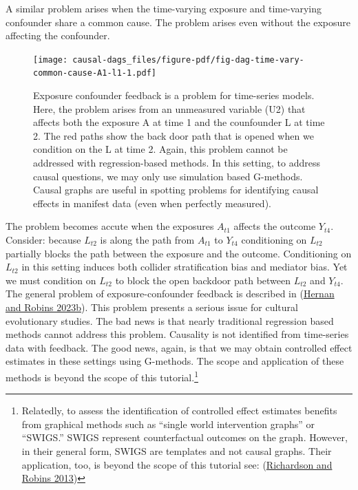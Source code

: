 \documentclass[
  singlecolumn]{report}
\begin{document}
A similar problem arises when the time-varying exposure and time-varying
confounder share a common cause. The problem arises even without the
exposure affecting the confounder.

\begin{figure}

{\centering \texttt{[image: causal-dags\_files/figure-pdf/fig-dag-time-vary-common-cause-A1-l1-1.pdf]}

}

\caption{\label{fig-dag-time-vary-common-cause-A1-l1}Exposure confounder
feedback is a problem for time-series models. Here, the problem arises
from an unmeasured variable (U2) that affects both the exposure A at
time 1 and the counfounder L at time 2. The red paths show the back door
path that is opened when we condition on the L at time 2. Again, this
problem cannot be addressed with regression-based methods. In this
setting, to address causal questions, we may only use simulation based
G-methods. Causal graphs are useful in spotting problems for identifying
causal effects in manifest data (even when perfectly measured).}

\end{figure}

The problem becomes accute when the exposures \(A_{t1}\) affects the
outcome \(Y_{t4}\). Consider: because \(L_{t2}\) is along the path from
\(A_{t1}\) to \(Y_{t4}\) conditioning on \(L_{t2}\) partially blocks the
path between the exposure and the outcome. Conditioning on \(L_{t2}\) in
this setting induces both collider stratification bias and mediator
bias. Yet we must condition on \(L_{t2}\) to block the open backdoor
path between \(L_{t2}\) and \(Y_{t4}\). The general problem of
exposure-confounder feedback is described in
(\protect\hyperlink{ref-hernan2023b}{Hernan and Robins 2023b}). This
problem presents a serious issue for cultural evolutionary studies. The
bad news is that nearly traditional regression based methods cannot
address this problem. Causality is not identified from time-series data
with feedback. The good news, again, is that we may obtain controlled
effect estimates in these settings using G-methods. The scope and
application of these methods is beyond the scope of this
tutorial.\footnote{Relatedly, to assess the identification of controlled
  effect estimates benefits from graphical methods such as ``single
  world intervention graphs'' or ``SWIGS.'' SWIGS represent
  counterfactual outcomes on the graph. However, in their general form,
  SWIGS are templates and not causal graphs. Their application, too, is
  beyond the scope of this tutorial see:
  (\protect\hyperlink{ref-richardson2013}{Richardson and Robins 2013})}
\end{document}
